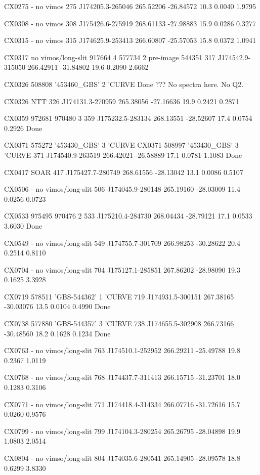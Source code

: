 CX0275 - no vimos
275 J174205.3-265046 265.52206 -26.84572 10.3 0.0040 1.9795

CX0308 - no vimos
308 J175426.6-275919 268.61133 -27.98883 15.9 0.0286 0.3277

CX0315 - no vimos
315 J174625.9-253413 266.60807 -25.57053 15.8 0.0372 1.0941

CX0317	 no vimos/long-slit	917664    	4  577734 2 pre-image  544351
317 J174542.9-315050 266.42911 -31.84802 19.6 0.2090 2.6662

CX0326 508808 '453460_GBS' 2 'CURVE
Done ??? No spectra here. No Q2. 

CX0326    NTT
326 J174131.3-270959 265.38056 -27.16636 19.9 0.2421 0.2871

CX0359	972681	970480		3  
359 J175232.5-283134 268.13551 -28.52607 17.4 0.0754 0.2926
Done 

CX0371 575272 '453430_GBS' 3 'CURVE
CX0371 508997 '453430_GBS' 3 'CURVE
371 J174540.9-263519 266.42021 -26.58889 17.1 0.0781 1.1083
Done 

CX0417 	SOAR
417 J175427.7-280749 268.61556 -28.13042 13.1 0.0086 0.5107

CX0506 - no vimos/long-slit
506 J174045.9-280148 265.19160 -28.03009 11.4 0.0256 0.0723

CX0533 975495 970476	 2
533 J175210.4-284730 268.04434 -28.79121 17.1 0.0533 3.6030
Done

CX0549 - no vimos/long-slit
549 J174755.7-301709 266.98253 -30.28622 20.4 0.2514 0.8110

CX0704 - no vimos/long-slit
704 J175127.1-285851 267.86202 -28.98090 19.3 0.1625 3.3928

CX0719 578511 'GBS-544362' 1 'CURVE
719 J174931.5-300151 267.38165 -30.03076 13.5 0.0104 0.4990
Done

CX0738 577880 'GBS-544357' 3 'CURVE
738 J174655.5-302908 266.73166 -30.48560 18.2 0.1628 0.1234
Done

CX0763 - no vimos/long-slit
763 J174510.1-252952 266.29211 -25.49788 19.8 0.2367 1.0119

CX0768 - no vimos/long-slit
768 J174437.7-311413 266.15715 -31.23701 18.0 0.1283 0.3106

CX0771 - no vimos/long-slit
771 J174418.4-314334 266.07716 -31.72616 15.7 0.0260 0.9576

CX0799 - no vimos/long-slit
799 J174104.3-280254 265.26795 -28.04898 19.9 1.0803 2.0514

CX0804 - no vimso/long-slit
804 J174035.6-280541 265.14905 -28.09578 18.8 0.6299 3.8330

